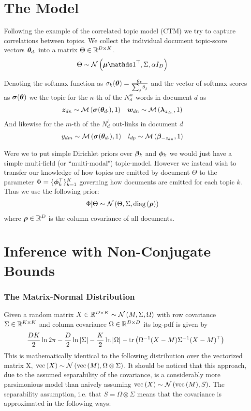 \section{The Model}
Following the example of the correlated topic model (CTM)\cite{Blei2006} we try to capture correlations between topics. We collect the individual document topic-score vectors ${ \bm \theta_{d\cdot} }$ into a matrix $\Theta \in { \mathbb{R}^{D \times K} }$. 
\begin{align}
\Theta &\sim \mnor{\vv{\mu}\one\T}{\Sigma}{\alpha I_D}
\end{align}

Denoting the softmax function as $\sigma_k(\bm \theta) = \frac{\theta_k}{\sum_j \theta_j}$ and the vector of softmax scores as $\bm \sigma(\bm \theta)$ we 
the topic for the $n$-th of the $N^w_d$ words in document $d$ as
\begin{align}
{  \bm z _{dn} } & \sim \mathcal{M} \left( {\bm \sigma({ \bm \theta_{d\cdot} })},{1} \right) &
{ \bm w_{dn} } & \sim \mathcal{M} \left( {\bm \lambda_{z_{dn}}},{1} \right)
\end{align}
And likewise for the $m$-th of the $N^l_d$ out-links in document $d$
\begin{align}
y_{dm} & \sim \mathcal{M} \left( {\bm \sigma({ \bm \theta_{d\cdot} })},{1} \right) &
l_{dp} & \sim \mathcal{M} \left( {\bm \beta_{- z_{dn}}},{1} \right)
\end{align}

Were we to put simple Dirichlet priors over $\bm \beta_k$ and $\bm \phi_k$ we would just have a simple multi-field (or ``multi-modal") topic-model\cite{Salomatin2009}. However we instead wish to transfer our knowledge of how topics are emitted by document $\Theta$ to the parameter $\Phi = \{ \bm \phi_k^\top \}_{k=1}^K$ governing how documents are emitted for each topic $k$. Thus we use the following prior:
\begin{align}
\Phi|\Theta & \sim \mathcal{N} \left(\Theta, \Sigma, \text{diag} \left( {\bm \rho} \right)\right)
\end{align}
where $\bm \rho \in { \mathbb{R}^{D} }$ is the column covariance of all documents. 

\section{Inference with Non-Conjugate Bounds}
\subsubsection*{The Matrix-Normal Distribution}
Given a random matrix $X \in { \mathbb{R}^{D \times K} } \sim \mathcal{N} \left(M, \Sigma, \Omega\right)$ with row covariance $\Sigma \in { \mathbb{R}^{K \times K} }$ and column covariance $\Omega \in { \mathbb{R}^{D \times D} }$ its log-pdf is given by
\begin{align}
\frac{DK}{2}\ln 2\pi - \frac{D}{2}\ln|\Sigma| - \frac{K}{2} \ln|\Omega| -\text{tr} \left( {{\Omega}^{-1}(X - M){\Sigma}^{-1}(X - M)^\top} \right)
\end{align}
This is mathematically identical to the following distribution over the vectorized matrix X, $\text{vec}\left(X\right) \sim \mathcal{N} \left( {\text{vec}\left(M\right)}, {\Omega \otimes \Sigma} \right)$. It should be noticed that this approach, due to the assumed separability of the covariance, is a considerably more parsimonious model than naively assuming $\text{vec}\left(X\right) \sim \mathcal{N} \left( {\text{vec}\left(M\right)}, {S} \right)$. The separability assumption, i.e. that $S = \Omega \otimes \Sigma$ means that the covariance is approximated in the following ways:

